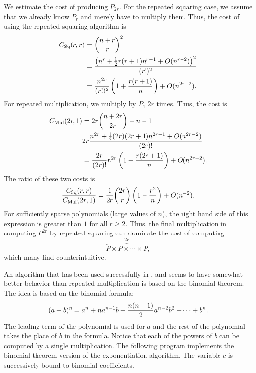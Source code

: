 We estimate the cost of producing $P_{2r}$.  For the repeated squaring
case, we assume that we already know $P_{r}$ and merely have to
multiply them.  Thus, the cost of using the repeated squaring
algorithm is
\[
\begin{aligned}
 C_{\rm Sq}(r,r) &= \binom{n + r}{r}^{2} \\
     & = \frac{\left(n^{r} + \frac{1}{2}r (r+1) n^{r-1}
                 + O(n^{r-2})\right)^{2}}{(r!)^{2}} \\
     & = \frac{n^{2r}}{(r!)^{2}}\left(1 + \frac{r(r+1)}{n}\right) 
                + O(n^{2r-2}).
\end{aligned}
\]
For repeated multiplication, we multiply by $P_{1}$ $2r$ times.  Thus, the
cost is
\[
\begin{aligned}
  C_{\rm Mul}(2r, 1) & = 2r \binom{n + 2r}{2r} - n-1 \\
     & 2r \frac{n^{2r} + \frac{1}{2}(2r)(2r+1) n^{2r-1} 
        + O(n^{2r-2})}{(2r)!} \\
     & = \frac{2r}{(2r)!}n^{2r}\left(1 + \frac{r(2r+1)}{n}\right) 
        + O(n^{2r-2}).
\end{aligned}
\]
The ratio of these two costs is 
\[
\frac{C_{\rm Sq}(r,r)}{C_{\rm Mul}(2r,1)} =
\frac{1}{2r} \binom{2r}{r} \left(1 - \frac{r^{2}}{n}\right) 
  + O(n^{-2}).
\]
For sufficiently sparse polynomials (large values of $n$), the right
hand side of this expression is greater than $1$ for all $r \ge 2$.
Thus, the final multiplication in computing $P^{2r}$ by repeated
squaring can dominate the cost of computing
\[
\overbrace{P \times P \times \cdots \times P}^{2r},
\]
which many find counterintuitive.

\medskip
An algorithm that has been used successfully in \Macsyma, and seems to have
somewhat better behavior than repeated multiplication is based on the
binomial theorem.  The idea is based on the binomial formula:
\[
(a + b)^n = a^n + n a^{n-1} b + {n (n - 1) \over 2} a^{n-2} b^2 +
\cdots + b^n.
\]
The leading term of the polynomial is used for $a$ and the rest of the
polynomial takes the place of $b$ in the formula.  Notice that each of the
powers of $b$ can be computed by a single multiplication.  The following
program implements the binomial theorem version of the exponentiation
algorithm.  The variable $c$ is successively bound to binomial
coefficients. 

